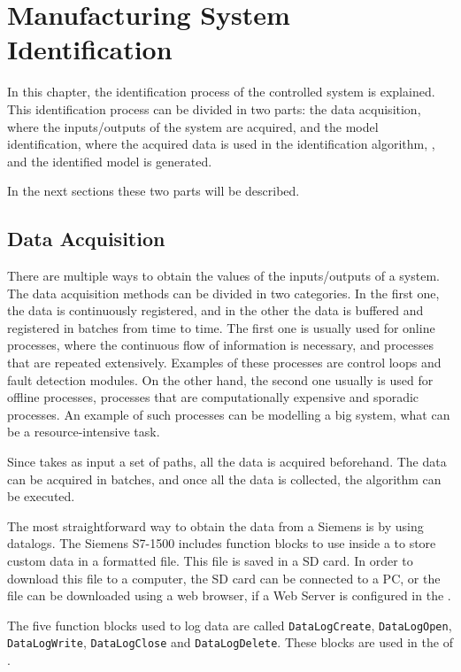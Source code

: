 
\chapter{Manufacturing System Identification}
\label{cha:ident}
In this chapter, the identification process of the controlled system is
explained. This identification process can be divided in two parts: the data acquisition, where the inputs\slash outputs of the system are
  acquired, and the model identification, where the acquired data is
  used in the identification algorithm, , and the
  identified model is generated.
  
In the next sections these two parts will be described.

\section{Data Acquisition}
There are multiple ways to obtain the values of the
inputs\slash outputs of a system. The data acquisition methods can be divided in two categories. In the first one,
the data is continuously registered, and in the other the data is buffered
and registered in batches from time to time.
The first one is usually used for online processes, where the continuous flow of
information is necessary, and processes that are repeated
extensively. Examples of these processes are control loops and fault
detection modules. On the other hand, the second one usually is used for offline
processes, processes that are computationally expensive and sporadic processes.
An example of such processes can be modelling a big system, what can be a
resource-intensive task.

Since  takes as input a set of paths, all the data is
acquired beforehand. The data can
be acquired in batches, and once all the data is collected, the algorithm can be
executed.

The most straightforward way to obtain the data from a Siemens \PLC{} is by using datalogs. The Siemens \PLC{} S7-1500 includes function blocks to
use inside a \LD{} to store custom data in a \CSV{} formatted file. This file is
saved in a SD card. In order to download this file to a computer, the SD card can be connected to a PC,
or the file can be downloaded using a web browser, if a Web Server is configured in the
\PLC.

The five function blocks used to log data are called
\verb|DataLogCreate|,
\verb|DataLogOpen|, \verb|DataLogWrite|, \verb|DataLogClose| and \verb|DataLogDelete|.
These blocks are used in the \LD{} of .


